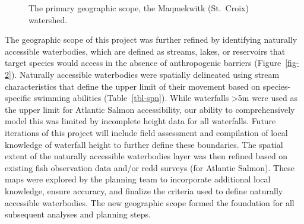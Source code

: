 \documentclass[
  letterpaper,
  DIV=11,
  numbers=noendperiod]{scrreprt}
\begin{document}
\begin{figure}


\caption{\label{fig-geoscope}The primary geographic scope, the
Maqmekwitk (St.~Croix) watershed.}

\end{figure}%

The geographic scope of this project was further refined by identifying
naturally accessible waterbodies, which are defined as streams, lakes,
or reservoirs that target species would access in the absence of
anthropogenic barriers (Figure~\ref{fig-2}). Naturally accessible
waterbodies were spatially delineated using stream characteristics that
define the upper limit of their movement based on species-specific
swimming abilities (Table~\ref{tbl-spn}). While waterfalls
\textgreater5m were used as the upper limit for Atlantic Salmon
accessibility, our ability to comprehensively model this was limited by
incomplete height data for all waterfalls. Future iterations of this
project will include field assessment and compilation of local knowledge
of waterfall height to further define these boundaries. The spatial
extent of the naturally accessible waterbodies layer was then refined
based on existing fish observation data and/or redd surveys (for
Atlantic Salmon). These maps were explored by the planning team to
incorporate additional local knowledge, ensure accuracy, and finalize
the criteria used to define naturally accessible waterbodies. The new
geographic scope formed the foundation for all subsequent analyses and
planning steps.
\end{document}
